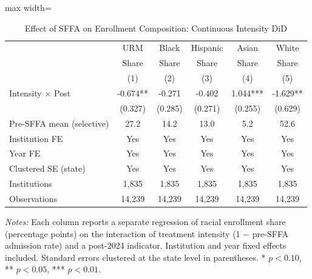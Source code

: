 \begin{table}[htbp]
\centering
\caption{Effect of SFFA on Enrollment Composition: Continuous Intensity DiD}
\label{tab:main}
\begin{threeparttable}
\begin{adjustbox}{max width=\textwidth}
\begin{tabular}{lccccc}
\toprule
 & URM & Black & Hispanic & Asian & White \\
 & Share & Share & Share & Share & Share \\
 & (1) & (2) & (3) & (4) & (5) \\
\midrule
Intensity $\times$ Post & -0.674** & -0.271 & -0.402 & 1.044*** & -1.629** \\
 & (0.327) & (0.285) & (0.271) & (0.255) & (0.629) \\
\midrule
Pre-SFFA mean (selective) & 27.2 & 14.2 & 13.0 & 5.2 & 52.6 \\
Institution FE & Yes & Yes & Yes & Yes & Yes \\
Year FE & Yes & Yes & Yes & Yes & Yes \\
Clustered SE (state) & Yes & Yes & Yes & Yes & Yes \\
Institutions & 1,835 & 1,835 & 1,835 & 1,835 & 1,835 \\
Observations & 14,239 & 14,239 & 14,239 & 14,239 & 14,239 \\
\bottomrule
\end{tabular}
\end{adjustbox}
\begin{tablenotes}[flushleft]\small
\item \textit{Notes:} Each column reports a separate regression of racial enrollment share (percentage points) on the interaction of treatment intensity (1 $-$ pre-SFFA admission rate) and a post-2024 indicator. Institution and year fixed effects included. Standard errors clustered at the state level in parentheses. * $p < 0.10$, ** $p < 0.05$, *** $p < 0.01$.
\end{tablenotes}
\end{threeparttable}
\end{table}
